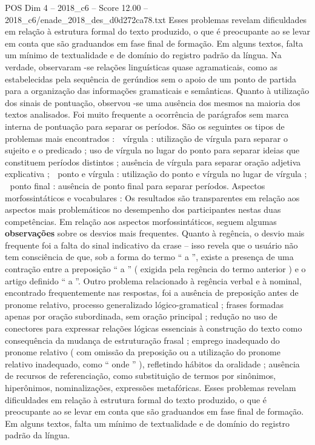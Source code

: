 \begin{textsample}{POS Dim 4 – 2018\_c6 – Score 12.00 – 2018\_c6/enade\_2018\_des\_d0d272ca78.txt}
Esses problemas revelam dificuldades em relação à estrutura formal do texto produzido, o que é preocupante ao se levar em conta que são graduandos em fase final de formação.
Em alguns textos, falta um mínimo de textualidade e de domínio do registro padrão da língua.
Na verdade, observaram -se relações linguísticas quase agramaticais, como as estabelecidas pela sequência de gerúndios sem o apoio de um ponto de partida para a organização das informações gramaticais e semânticas.
Quanto à utilização dos sinais de pontuação, observou -se uma ausência dos mesmos na maioria dos textos analisados.
Foi muito frequente a ocorrência de parágrafos sem marca interna de pontuação para separar os períodos.
São os seguintes os tipos de problemas mais encontrados :  vírgula : utilização de vírgula para separar o sujeito e o predicado ; uso de vírgula no lugar do ponto para separar ideias que constituem períodos distintos ; ausência de vírgula para separar oração adjetiva explicativa ;  ponto e vírgula : utilização do ponto e vírgula no lugar de vírgula ;  ponto final : ausência de ponto final para separar períodos.
Aspectos morfossintáticos e vocabulares : Os resultados são transparentes em relação aos aspectos mais problemáticos no desempenho dos participantes nestas duas competências.
Em relação aos aspectos morfossintáticos, seguem algumas \textbf{observações} sobre os desvios mais frequentes.
Quanto à regência, o desvio mais frequente foi a falta do sinal indicativo da crase – isso revela que o usuário não tem consciência de que, sob a forma do termo “ a ”, existe a presença de uma contração entre a preposição “ a ” ( exigida pela regência do termo anterior ) e o artigo definido “ a ”.
Outro problema relacionado à regência verbal e à nominal, encontrado frequentemente nas respostas, foi a ausência de preposição antes de pronome relativo, processo generalizado lógico-gramatical ; frases formadas apenas por oração subordinada, sem oração principal ; redução no uso de conectores para expressar relações lógicas essenciais à construção do texto como consequência da mudança de estruturação frasal ; emprego inadequado do pronome relativo ( com omissão da preposição ou a utilização do pronome relativo inadequado, como “ onde ” ), refletindo hábitos da oralidade ; ausência de recursos de referenciação, como substituição de termos por sinônimos, hiperônimos, nominalizações, expressões metafóricas.
Esses problemas revelam dificuldades em relação à estrutura formal do texto produzido, o que é preocupante ao se levar em conta que são graduandos em fase final de formação.
Em alguns textos, falta um mínimo de textualidade e de domínio do registro padrão da língua.

\end{textsample}
